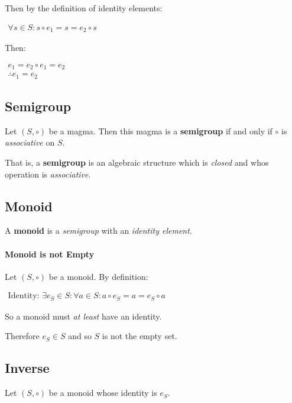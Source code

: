 Then by the definition of identity elements:

\begin{math}
  \begin{array}{c}
    \forall s \in S: s \circ e_1 = s = e_2 \circ s
  \end{array}
\end{math}

Then:

\begin{math}
  \begin{array}{c}
    e_1 = e_2 \circ e_1 = e_2 \\
    \therefore e_1 = e_2
  \end{array}
\end{math}



\subsection{Semigroup}

Let $(S, \circ)$ be a magma. Then this magma is a \textbf{semigroup}
if and only if $\circ$ is \textit{associative} on $S$.


That is, a \textbf{semigroup} is an algebraic structure which is
\textit{closed} and whos operation is \textit{associative}.


\subsection{Monoid}

A \textbf{monoid} is a \textit{semigroup} with an \textit{identity
  element}.

\paragraph{Monoid is not Empty}

Let $(S, \circ)$ be a monoid. By definition:

\begin{math}
  \begin{array}{c}
    \text{Identity: } \exists e_S \in S : \forall a \in S: a \circ e_S = a = e_S \circ a
  \end{array}
\end{math}

So a monoid must \textit{at least} have an identity.

Therefore $e_S \in S $ and so $S$ is not the empty set.


\subsection{Inverse}
Let $(S, \circ)$ be a monoid whose identity is $e_S$.

